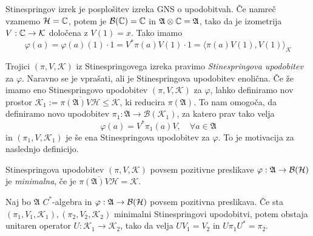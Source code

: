 \begin{opomba}
    Stinespringov izrek je posplošitev izreka GNS o upodobitvah. 
    Če namreč vzamemo $\mathcal{H} = \mathbb C$, potem je $\mathcal{B}(\mathbb C) = \mathbb C$ in $\mathfrak{A} \otimes \mathbb C = \mathfrak{A}$, tako da je izometrija 
    $V: \mathbb C \to \mathcal{K}$ določena z $V(1) = x$. Tako imamo 
    $$\varphi(a) = \varphi(a) (1) \cdot 1 = V^* \pi(a) V(1) \cdot 1 = \langle \pi (a) V(1), V(1) \rangle_{\mathcal{K}}$$
\end{opomba}

Trojici $(\pi, V, \mathcal{K})$ iz Stinespringovega izreka pravimo \emph{Stinespringova upodobitev}
za $\varphi$. Naravno se je vprašati, ali je Stinespringova upodobitev enolična. 
Če že imamo eno Stinespringovo upodobitev $(\pi, V, \mathcal{K})$ za $\varphi$, lahko definiramo nov prostor $\mathcal{K}_1 := \overline{\pi(\mathfrak{A}) V \mathcal{H}} \leq \mathcal{K}$, ki reducira $\pi (\mathfrak{A})$.
To nam omogoča, da definiramo novo upodobitev $\pi_1: \mathfrak{A} \to \mathcal{B}(\mathcal{K}_1)$, za katero prav tako velja $$\varphi(a) = V^* \pi_1 (a) V,\quad \forall a \in \mathfrak{A}$$
in $(\pi_1, V, \mathcal{K}_1)$ je še ena Stinespringova upodobitev za $\varphi$. To je motivacija za naslednjo definicijo.

\begin{definicija}
    Stinespringova upodobitev $(\pi, V, \mathcal{K})$ povsem pozitivne preslikave $\varphi: \mathfrak{A} \to \operatorname{\mathcal{B} (\mathcal{H})}$ je \emph{minimalna}, če je $\overline{\pi(\mathfrak{A}) V \mathcal{H}} = \mathcal{K}$.
\end{definicija}

\begin{trditev}
    Naj bo $\mathfrak{A}$ $C^*$-algebra in $\varphi: \mathfrak{A} \to \operatorname{\mathcal{B} (\mathcal{H})}$ povsem pozitivna preslikava. 
    Če sta $(\pi_1, V_1, \mathcal{K}_1), (\pi_2, V_2, \mathcal{K}_2)$ 
    minimalni Stinespringovi upodobitvi, potem obstaja unitaren operator $U: \mathcal{K}_1 \to \mathcal{K}_2$, tako da velja
    $U V_1 = V_2$ in $U \pi_1 U^* = \pi_2$.
\end{trditev}

